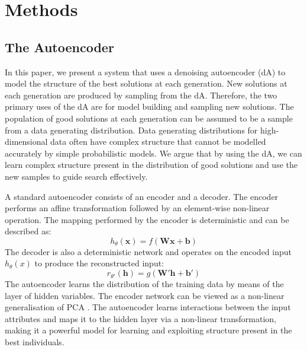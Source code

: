 \documentclass[runningheads,a4paper]{llncs}
\begin{document}
\section{Methods}

\subsection{The Autoencoder}

In this paper, we present a system that uses a denoising autoencoder (dA) to model the structure of the best solutions at each generation. New solutions at each generation are produced by sampling from the dA. Therefore, the two primary uses of the dA are for model building and sampling new solutions. The population of good solutions at each generation can be assumed to be a sample from a data generating distribution. Data generating distributions for high-dimensional data often have complex structure that cannot be modelled accurately by simple probabilistic models. We argue that by using the dA, we can learn complex structure present in the distribution of good solutions and use the new samples to guide search effectively. 




A standard autoencoder consists of an encoder and a decoder. The encoder performs an affine transformation followed by an element-wise non-linear operation. The mapping performed by the encoder is deterministic and can be described as: $$h_{\theta}(\mathbf{x}) = f(\mathbf{Wx + b})$$ The decoder is also a deterministic network and operates on the encoded input $h_{\theta}(x)$ to produce the reconstructed input: $$ r_{\theta'}(\mathbf{h}) = g(\mathbf{W'h + b'})$$ The autoencoder learns the distribution of the training data by means of the layer of hidden variables. The encoder network can be viewed as a non-linear generalisation of PCA \cite{hinton2006reducing}. The autoencoder learns interactions between the input attributes and maps it to the hidden layer via a non-linear transformation, making it a powerful model for learning and exploiting structure present in the best individuals.
\end{document}
